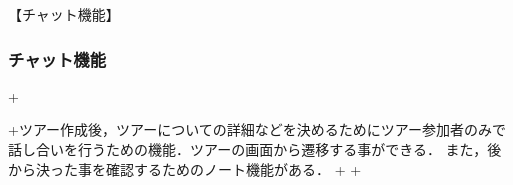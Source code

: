 【チャット機能】
\par
\subsubsection{チャット機能}
+\par
+ツアー作成後，ツアーについての詳細などを決めるためにツアー参加者のみで話し合いを行うための機能．ツアーの画面から遷移する事ができる．
また，後から決った事を確認するためのノート機能がある．
+
+

